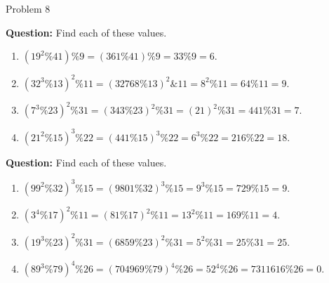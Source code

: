 \begin{problem}{Problem 8}
    \begin{Highlight}[Solution - \#32]
        \noindent \textbf{Question:} Find each of these values.

        \begin{enumerate}[label=(\alph*)]
            \item $(19^{2} \% 41) \% 9 = (361 \% 41) \% 9 = 33 \% 9 = 6.$
            \item $(32^{3} \% 13)^{2} \% 11 = (32768 \% 13)^{2} \& 11 = 8^{2} \% 11 = 64 \% 11 = 9.$
            \item $(7^{3} \% 23)^{2} \% 31 = (343 \% 23)^{2} \% 31 = (21)^{2} \% 31 = 441 \% 31 = 7.$
            \item $(21^{2} \% 15)^{3} \% 22 = (441 \% 15)^{3} \% 22 = 6^{3} \% 22 = 216 \% 22 = 18.$
        \end{enumerate}
    \end{Highlight}

    \begin{Highlight}[Solution - \#33]
        \noindent \textbf{Question:} Find each of these values.

        \begin{enumerate}[label=(\alph*)]
            \item $(99^{2} \% 32)^{3} \% 15 = (9801 \% 32)^{3} \% 15 = 9^{3} \% 15 = 729 \% 15 = 9.$
            \item $(3^{4} \% 17)^{2} \% 11 = (81 \% 17)^{2} \% 11 = 13^{2} \% 11 = 169 \% 11 = 4.$
            \item $(19^{3} \% 23)^{2} \% 31 = (6859 \% 23)^{2} \% 31 = 5^{2} \% 31 = 25 \% 31 = 25.$
            \item $(89^{3} \% 79)^{4} \% 26 = (704969 \% 79)^{4} \% 26 = 52^{4} \% 26 = 7311616 \% 26 = 0.$
        \end{enumerate}
    \end{Highlight}
\end{problem}

